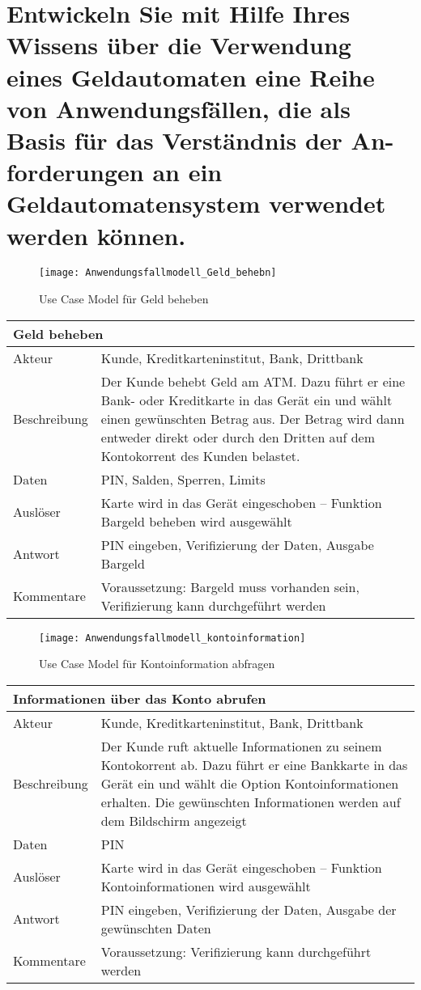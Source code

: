 \documentclass[12pt]{article}
\begin{document}
\section{Entwickeln Sie mit Hilfe Ihres Wissens über die Verwendung eines Geldautomaten eine Reihe von Anwendungsfällen, die als Basis für das Verständnis der An- forderungen an ein Geldautomatensystem verwendet werden können.}
\begin{figure}[h]
 \begin{center}
  \texttt{[image: Anwendungsfallmodell\_Geld\_behebn]}
 \end{center}
 \caption{Use Case Model für Geld beheben}
\end{figure}
\begin{tabular}{ |p{3cm}|p{13cm}|  }
 \hline
 \multicolumn{2}{|l|}{\textbf{Geld beheben}} \\
 \hline
 Akteur&Kunde, Kreditkarteninstitut, Bank, Drittbank\\
 \hline
 Beschreibung&Der Kunde behebt Geld am ATM. Dazu führt er eine Bank- oder Kreditkarte in das Gerät ein und wählt einen gewünschten Betrag aus. Der Betrag wird dann entweder direkt oder durch den Dritten auf dem Kontokorrent des Kunden belastet.\\
 \hline
 Daten&PIN, Salden, Sperren, Limits\\
 Auslöser&Karte wird in das Gerät eingeschoben – Funktion Bargeld beheben wird ausgewählt\\
 \hline
 Antwort&PIN eingeben, Verifizierung der Daten, Ausgabe Bargeld\\
 \hline
 Kommentare&Voraussetzung: Bargeld muss vorhanden sein, Verifizierung kann durchgeführt werden\\
 \hline
\end{tabular}
\pagebreak
\begin{figure}[h]
 \begin{center}
  \texttt{[image: Anwendungsfallmodell\_kontoinformation]}
 \end{center}
 \caption{Use Case Model für Kontoinformation abfragen}
\end{figure}
\begin{tabular}{ |p{3cm}|p{13cm}|  }
 \hline
 \multicolumn{2}{|l|}{\textbf{Informationen über das Konto abrufen}} \\
 \hline
 Akteur&Kunde, Kreditkarteninstitut, Bank, Drittbank\\
 \hline
 Beschreibung&Der Kunde ruft aktuelle Informationen zu seinem Kontokorrent ab. Dazu führt er eine Bankkarte in das Gerät ein und wählt die Option Kontoinformationen erhalten. Die gewünschten Informationen werden auf dem Bildschirm angezeigt\\
 \hline
 Daten&PIN\\
 Auslöser&Karte wird in das Gerät eingeschoben – Funktion Kontoinformationen wird ausgewählt\\
 \hline
 Antwort&PIN eingeben, Verifizierung der Daten, Ausgabe der gewünschten Daten\\
 \hline
 Kommentare&Voraussetzung: Verifizierung kann durchgeführt werden\\
 \hline
\end{tabular}
\end{document}
